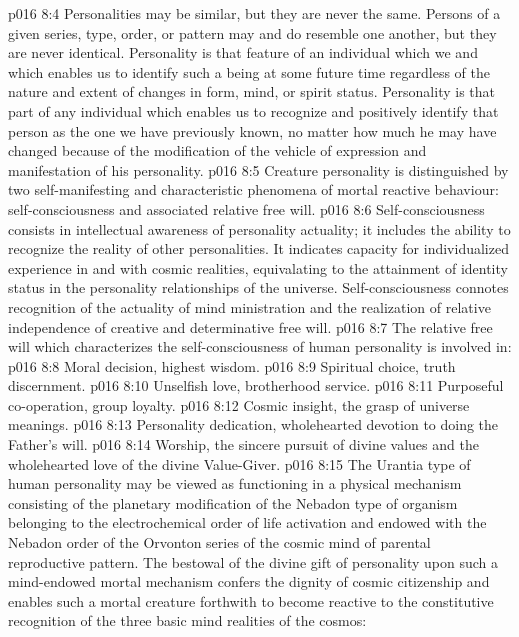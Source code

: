 \vs p016 8:4 Personalities may be similar, but they are never the same. Persons of a given series, type, order, or pattern may and do resemble one another, but they are never identical. Personality is that feature of an individual which we  and which enables us to identify such a being at some future time regardless of the nature and extent of changes in form, mind, or spirit status. Personality is that part of any individual which enables us to recognize and positively identify that person as the one we have previously known, no matter how much he may have changed because of the modification of the vehicle of expression and manifestation of his personality.
\vs p016 8:5 \pc Creature personality is distinguished by two self\hyp{}manifesting and characteristic phenomena of mortal reactive behaviour: self\hyp{}consciousness and associated relative free will.
\vs p016 8:6 Self\hyp{}consciousness consists in intellectual awareness of personality actuality; it includes the ability to recognize the reality of other personalities. It indicates capacity for individualized experience in and with cosmic realities, equivalating to the attainment of identity status in the personality relationships of the universe. Self\hyp{}consciousness connotes recognition of the actuality of mind ministration and the realization of relative independence of creative and determinative free will.
\vs p016 8:7 \pc The relative free will which characterizes the self\hyp{}consciousness of human personality is involved in:
\vs p016 8:8 \bibnobreakspace Moral decision, highest wisdom.
\vs p016 8:9 \bibnobreakspace Spiritual choice, truth discernment.
\vs p016 8:10 \bibnobreakspace Unselfish love, brotherhood service.
\vs p016 8:11 \bibnobreakspace Purposeful co\hyp{}operation, group loyalty.
\vs p016 8:12 \bibnobreakspace Cosmic insight, the grasp of universe meanings.
\vs p016 8:13 \bibnobreakspace Personality dedication, wholehearted devotion to doing the Father’s will.
\vs p016 8:14 \bibnobreakspace Worship, the sincere pursuit of divine values and the wholehearted love of the divine Value\hyp{}Giver.
\vs p016 8:15 \pc The Urantia type of human personality may be viewed as functioning in a physical mechanism consisting of the planetary modification of the Nebadon type of organism belonging to the electrochemical order of life activation and endowed with the Nebadon order of the Orvonton series of the cosmic mind of parental reproductive pattern. The bestowal of the divine gift of personality upon such a mind\hyp{}endowed mortal mechanism confers the dignity of cosmic citizenship and enables such a mortal creature forthwith to become reactive to the constitutive recognition of the three basic mind realities of the cosmos:
